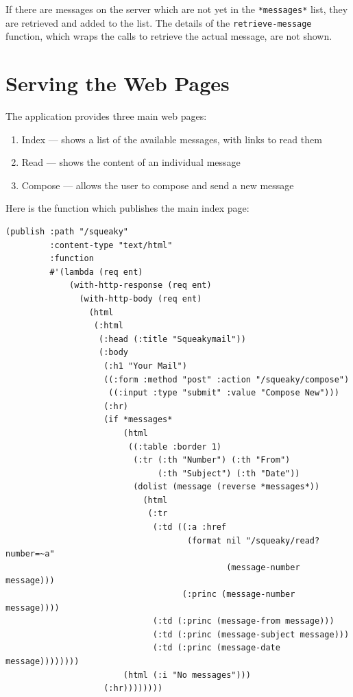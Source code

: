 If there are messages on the server which are not yet in the \texttt{*messages*} list, they are
retrieved and added to the list. The details of the \texttt{retrieve-message} function, which
wraps the calls to retrieve the actual message, are not shown.

\section{Serving the Web Pages}

The application provides three main web pages:

\begin{enumerate}
\item Index --- shows a list of the available messages, with links to read them
\item Read --- shows the content of an individual message
\item Compose --- allows the user to compose and send a new message
\end{enumerate}

Here is the function which publishes the main index page:

\begin{verbatim}
(publish :path "/squeaky"
         :content-type "text/html"
         :function
         #'(lambda (req ent)
             (with-http-response (req ent)
               (with-http-body (req ent)
                 (html
                  (:html
                   (:head (:title "Squeakymail"))
                   (:body
                    (:h1 "Your Mail")
                    ((:form :method "post" :action "/squeaky/compose")
                     ((:input :type "submit" :value "Compose New")))
                    (:hr)
                    (if *messages*
                        (html
                         ((:table :border 1)
                          (:tr (:th "Number") (:th "From")
                               (:th "Subject") (:th "Date"))
                          (dolist (message (reverse *messages*))
                            (html
                             (:tr
                              (:td ((:a :href
                                     (format nil "/squeaky/read?number=~a"
                                             (message-number message)))
                                    (:princ (message-number message))))
                              (:td (:princ (message-from message)))
                              (:td (:princ (message-subject message)))
                              (:td (:princ (message-date message))))))))
                        (html (:i "No messages")))
                    (:hr))))))))
\end{verbatim}

